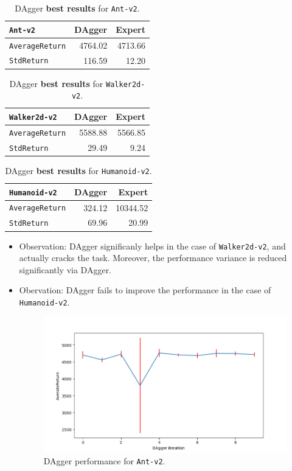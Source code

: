 \documentclass[11pt]{article}
\begin{document}
\begin{table}[htbp]
\caption[DAgger for \texttt{Ant-v2}]{DAgger \textbf{\textbf{best results}} for \texttt{Ant-v2}.}
\centering
\begin{tabular}{l|r|r}
\texttt{Ant-v2} & DAgger & Expert\\
\hline
\texttt{AverageReturn} & 4764.02 & 4713.66\\
\hline
\texttt{StdReturn} & 116.59 & 12.20\\
\end{tabular}
\end{table}


\begin{table}[htbp]
\caption[DAgger for \texttt{Walker2d-v2}]{DAgger \textbf{\textbf{best results}} for \texttt{Walker2d-v2}.}
\centering
\begin{tabular}{l|r|r}
\texttt{Walker2d-v2} & DAgger & Expert\\
\hline
\texttt{AverageReturn} & 5588.88 & 5566.85\\
\hline
\texttt{StdReturn} & 29.49 & 9.24\\
\end{tabular}
\end{table}


\begin{table}[htbp]
\caption[DAgger for \texttt{Humanoid-v2}]{DAgger \textbf{\textbf{best results}} for \texttt{Humanoid-v2}.}
\centering
\begin{tabular}{l|r|r}
\texttt{Humanoid-v2} & DAgger & Expert\\
\hline
\texttt{AverageReturn} & 324.12 & 10344.52\\
\hline
\texttt{StdReturn} & 69.96 & 20.99\\
\end{tabular}
\end{table}

\begin{itemize}
\item Observation: DAgger significanly helps in the case of \texttt{Walker2d-v2}, and actually cracks the task. Moreover, the performance variance is reduced significantly via DAgger.

\item Obervation: DAgger fails to improve the performance in the case of \texttt{Humanoid-v2}.

\begin{figure}[htbp]
\centering
\includegraphics[width=.9\linewidth]{./Figure_2.png}
\caption{DAgger performance for \texttt{Ant-v2}.}
\end{figure}
\end{itemize}
\end{document}
